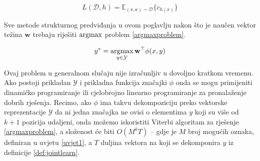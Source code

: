 \begin{equation} \label{funcloss}
  L(\mathcal{D}, h) = \mathbb{E}_{(x, \mathbf{c}) \sim \mathcal{D}} \{c_{h(x)}\}
\end{equation}

Sve metode strukturnog predviđanja u ovom poglavlju nakon što je naučen vektor
težina $\mathbf{w}$ trebaju riješiti $\operatorname*{argmax}$ problem \ref{argmaxproblem}.

\begin{equation}\label{argmaxproblem}
  y\ssymbol{1} = \argmax_{y \in \mathcal{Y}} \mathbf{w}^\top \phi(x, y)
\end{equation}

Ovaj problem u generalnom slučaju nije izračunljiv u dovoljno kratkom vremenu.
Ako postoji prikladan $\mathcal{Y}$ i prikladna funkcija značajki $\phi$ onda se
mogu primijeniti dinamičko programiranje  ili
cjelobrojno linearno programiranje  za
pronalaženje dobrih rješenja. Recimo, ako $\phi$ ima takvu dekompoziciju preko
vektorske reprezentacije $\mathcal{Y}$ da ni jedna značajka ne ovisi o
elementima $y$ koji su više od $k+1$ pozicija udaljeni, onda možemo iskoristiti
Viterbi algoritam za rješenje \ref{argmaxproblem}, a složenost će biti $O(M^k
T)$ -- gdje je $M$ broj mogućih oznaka, definiran u uvjetu \ref{uvjet1}, a $T$
duljina vektora na koji se dekomponira $y$ iz definicije \ref{def:jointlearn}.
